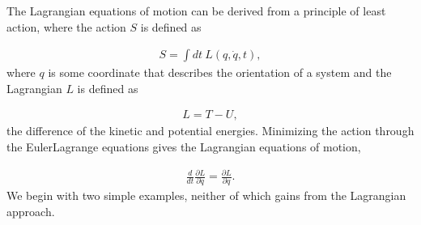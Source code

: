 \documentclass[letterpaper,10pt,english]{sphinxmanual}
\begin{document}
The Lagrangian equations of motion can be derived from a principle of
least action, where the action \(S\) is defined as




\begin{equation*}
\begin{split}
\begin{equation}
S=\int dt~ L(q,\dot{q},t),
\label{_auto96} \tag{132}
\end{equation}
\end{split}
\end{equation*}
where \(q\) is some coordinate that describes the orientation of a
system and the Lagrangian \(L\) is defined as




\begin{equation*}
\begin{split}
\begin{equation}
L=T-U,
\label{_auto97} \tag{133}
\end{equation}
\end{split}
\end{equation*}
the difference of the kinetic and potential energies. Minimizing the
action through the Euler\sphinxhyphen{}Lagrange equations gives the Lagrangian
equations of motion,




\begin{equation*}
\begin{split}
\begin{equation}
\frac{d}{dt}\frac{\partial L}{\partial \dot{q}}=\frac{\partial L}{\partial q}.
\label{_auto98} \tag{134}
\end{equation}
\end{split}
\end{equation*}
We begin with two simple examples, neither of which gains from the Lagrangian approach.
\end{document}
